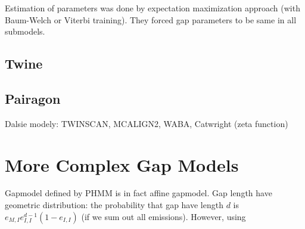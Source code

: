 Estimation of parameters was done by expectation maximization approach (with
Baum-Welch or Viterbi training). They forced gap parameters to be same in all
submodels.

\subsection{Twine}
\subsection{Pairagon}


Dalsie modely: TWINSCAN, MCALIGN2, WABA, Catwright (zeta function)

\section{More Complex Gap Models}
Gapmodel defined by PHMM is in fact affine gapmodel.
Gap length have geometric distribution: the probability that gap have length $d$
is $e_{M,I}e_{I,I}^{d-1}(1-e_{I,I})$ (if we sum out all emissions). However,
using

